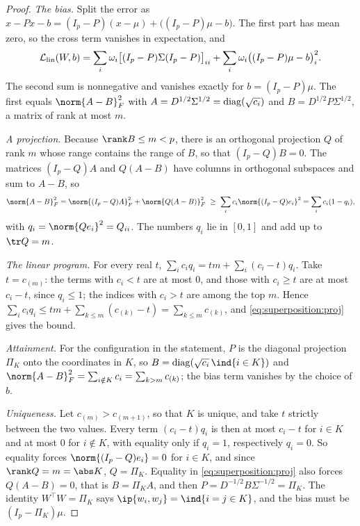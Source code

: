 \begin{refsection}
\begin{proof}
\emph{The bias.} Split the error as $x-Px-b=(I_p-P)(x-\mu)+\bigl((I_p-P)\mu-b\bigr)$. The first part has mean zero, so the cross term vanishes in expectation, and
\[
  \mathcal{L}_{\mathrm{lin}}(W,b)=\sum_i\omega_i\bigl[(I_p-P)\Sigma(I_p-P)\bigr]_{ii}+\sum_i\omega_i\bigl((I_p-P)\mu-b\bigr)_i^2 .
\]
The second sum is nonnegative and vanishes exactly for $b=(I_p-P)\mu$. The first equals $\norm{A-B}_F^2$ with $A=D^{1/2}\Sigma^{1/2}=\operatorname{diag}(\sqrt{c_i})$ and $B=D^{1/2}P\Sigma^{1/2}$, a matrix of rank at most $m$.

\emph{A projection.} Because $\rank B\le m<p$, there is an orthogonal projection $Q$ of rank $m$ whose range contains the range of $B$, so that $(I_p-Q)B=0$. The matrices $(I_p-Q)A$ and $Q(A-B)$ have columns in orthogonal subspaces and sum to $A-B$, so
\begin{equation}\label{eq:superposition:proj}
  \norm{A-B}_F^2=\norm{(I_p-Q)A}_F^2+\norm{Q(A-B)}_F^2\ \ge\ \sum_ic_i\norm{(I_p-Q)e_i}^2=\sum_ic_i(1-q_i),
\end{equation}
with $q_i=\norm{Qe_i}^2=Q_{ii}$. The numbers $q_i$ lie in $[0,1]$ and add up to $\tr Q=m$.

\emph{The linear program.} For every real $t$, $\sum_ic_iq_i=tm+\sum_i(c_i-t)q_i$. Take $t=c_{(m)}$: the terms with $c_i<t$ are at most $0$, and those with $c_i\ge t$ are at most $c_i-t$, since $q_i\le1$; the indices with $c_i>t$ are among the top $m$. Hence $\sum_ic_iq_i\le tm+\sum_{k\le m}(c_{(k)}-t)=\sum_{k\le m}c_{(k)}$, and \eqref{eq:superposition:proj} gives the bound.

\emph{Attainment.} For the configuration in the statement, $P$ is the diagonal projection $\Pi_K$ onto the coordinates in $K$, so $B=\diag(\sqrt{c_i}\,\ind\{i\in K\})$ and $\norm{A-B}_F^2=\sum_{i\notin K}c_i=\sum_{k>m}c_{(k)}$; the bias term vanishes by the choice of $b$.

\emph{Uniqueness.} Let $c_{(m)}>c_{(m+1)}$, so that $K$ is unique, and take $t$ strictly between the two values. Every term $(c_i-t)q_i$ is then at most $c_i-t$ for $i\in K$ and at most $0$ for $i\notin K$, with equality only if $q_i=1$, respectively $q_i=0$. So equality forces $\norm{(I_p-Q)e_i}=0$ for $i\in K$, and since $\rank Q=m=\abs K$, $Q=\Pi_K$. Equality in \eqref{eq:superposition:proj} also forces $Q(A-B)=0$, that is $B=\Pi_KA$, and then $P=D^{-1/2}B\Sigma^{-1/2}=\Pi_K$. The identity $W^\top W=\Pi_K$ says $\ip{w_i,w_j}=\ind\{i=j\in K\}$, and the bias must be $(I_p-\Pi_K)\mu$.
\end{proof}


\end{refsection}

